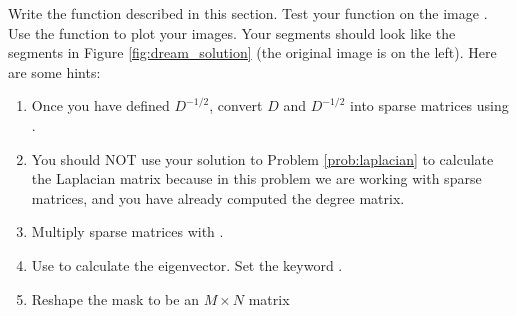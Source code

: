 \begin{problem} Write the function  described in this section.  Test your function on the image . Use the function  to plot your images. Your segments should look like the segments in Figure \ref{fig:dream_solution} (the original image is on the left). Here are some hints:

\begin{enumerate}
\item Once you have defined $D^{-1/2}$, convert $D$ and $D^{-1/2}$ into sparse matrices using .
\item You should NOT use your solution to Problem \ref{prob:laplacian} to calculate the Laplacian matrix because in this problem we are working with sparse matrices, and you have already computed the degree matrix.

\item Multiply sparse matrices with .

\item Use  to calculate the eigenvector. Set the keyword .

\item Reshape the mask to be an $M \times N$ matrix


\end{enumerate}

\end{problem}

